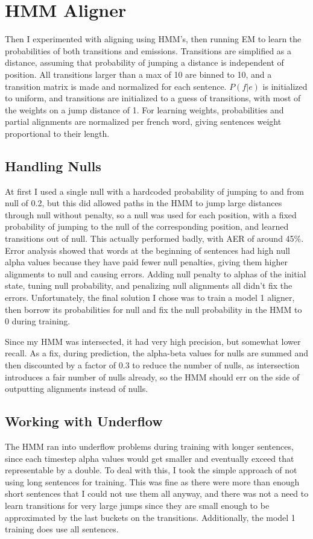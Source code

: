 \documentclass[11pt]{article}
\begin{document}
\section{HMM Aligner}

Then I experimented with aligning using HMM's, then running EM to learn the probabilities of
both transitions and emissions. Transitions are simplified as a distance, assuming that
probability of jumping a distance is independent of position. All transitions larger than
a max of 10 are binned to 10, and a transition matrix is made and normalized for each sentence. 
$P(f|e)$ is initialized to uniform, and transitions
are initialized to a guess of transitions, with most of the weights on a jump distance of 1.
For learning weights, probabilities and partial alignments are normalized per french word,
giving sentences weight proportional to their length.

\subsection{Handling Nulls}
At first I used a single null with a hardcoded probability of jumping to and from null of 0.2,
but this did allowed paths in the HMM to jump large distances through null without penalty,
so a null was used for each position, with a fixed probability of jumping to the null of 
the corresponding position, and learned transitions out of null. This actually performed
badly, with AER of around 45\%. Error analysis showed that words at the beginning of sentences
had high null alpha values because they have paid fewer null penalties, 
giving them higher alignments to null and causing errors. Adding null penalty to alphas of
the initial state, tuning null probability, and penalizing null alignments 
all didn't fix the errors. Unfortunately, the final solution I chose was to train a
model 1 aligner, then borrow its probabilities for null and fix the null probability in the
HMM to 0 during training. 

Since my HMM was intersected, it had very high precision, but somewhat lower recall.
As a fix, during prediction, the alpha-beta values for nulls are summed and then discounted
by a factor of 0.3 to reduce the number of nulls, as intersection introduces a fair number
of nulls already, so the HMM should err on the side of outputting alignments instead of nulls.

\subsection{Working with Underflow}
The HMM ran into underflow problems during training with longer sentences, since each
timestep alpha values would get smaller and eventually exceed that representable by a double.
To deal with this, I took the simple approach of not using long sentences for training.
This was fine as there were more than enough short sentences that I could not use them all
anyway, and there was not a need to learn transitions for very large jumps since they
are small enough to be approximated by the last buckets on the transitions. Additionally,
the model 1 training does use all sentences.
\end{document}
